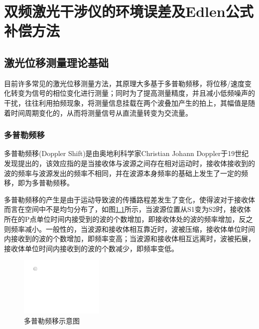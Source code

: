 \chapter{双频激光干涉仪的环境误差及Edlen公式补偿方法}




\section{激光位移测量理论基础}
目前许多常见的激光位移测量方法，其原理大多基于多普勒频移，将位移/速度变化转变为信号的相位变化进行测量；同时为了提高测量精度，并且减小低频噪声的干扰，往往利用拍频现象，将测量信息挂载在两个波叠加产生的拍上，其幅值是随着时间周期变化的，从而将测量信号从直流量转变为交流量。



\subsection{多普勒频移}
多普勒频移(Doppler Shift)是由奥地利科学家Christian Johann Doppler于19世纪发现提出的\cite{基于激光多普勒测速的自由场空气声压测量研究}，该效应指的是当接收体与波源之间存在相对运动时，接收体接收到的波的频率与波源发出的频率不相同，并在波源本身频率的基础上发生了一定的频移，即为多普勒频移。

多普勒频移的产生是由于运动导致波的传播路程差发生了变化，使得波对于接收体而言在空间中不是均匀分布了，如图\ref{fig:多普勒频移示意图}所示，当波源位置从S1变为S2时，接收体所在的P点单位时间内接受到的波的个数增加，即接收体处的波的频率增加，反之则频率减小。一般性的，当波源和接收体相互靠近时，波被压缩，接收体单位时间内接收到的波的个数增加，即频率变高；当波源和接收体相互远离时，波被拓展，接收体单位时间内接收到的波的个数减少，即频率变低。
\begin{figure}[htb]
    \centering
    \includegraphics[width=4cm]{fig/2-fig/多普勒频移示意图.drawio.pdf}
    \caption{多普勒频移示意图}
    \label{fig:多普勒频移示意图}
  \end{figure}





